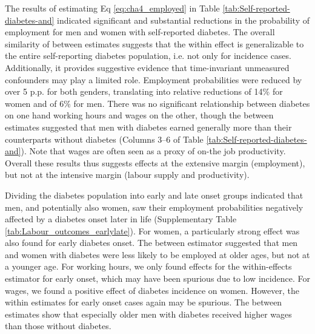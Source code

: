 \documentclass[10pt,letterpaper]{article}
\begin{document}
The results of estimating Eq \ref{eq:cha4_employed} in Table \ref{tab:Self-reported-diabetes-and} indicated significant and substantial reductions in the probability of employment for men and women with self-reported diabetes. The overall similarity of between estimates suggests that the within effect is generalizable to the entire self-reporting diabetes population, i.e. not only for incidence cases. Additionally, it provides suggestive evidence that time-invariant unmeasured confounders may play a limited role. Employment probabilities were reduced by over 5 \ac{p.p.} for both genders, translating into relative reductions of 14\% for women and of 6\% for men. There was no significant relationship between diabetes on one hand working hours and wages on the other, though the between estimates suggested that men with diabetes earned generally more than their counterparts without diabetes (Columns 3--6 of Table \ref{tab:Self-reported-diabetes-and}). Note that wages are often seen as a proxy of on-the job productivity. Overall these results thus suggests effects at the extensive margin (employment), but not at the intensive margin (labour supply and productivity). 

Dividing the diabetes population into early and late onset groups indicated that men, and potentially also women, saw their employment probabilities negatively affected by a diabetes onset later in life (Supplementary Table \ref{tab:Labour_outcomes_earlylate}). For women, a particularly strong effect was also found for early diabetes onset. The between estimator suggested that men and women with diabetes were less likely to be employed at older ages, but not at a younger age. For working hours, we only found effects for the within-effects estimator for early onset, which may have been spurious due to low incidence. For wages, we found a positive effect of diabetes incidence on women. However, the within estimates for early onset cases again may be spurious. The between estimates show that especially older men with diabetes received higher wages than those without diabetes. 
\end{document}
